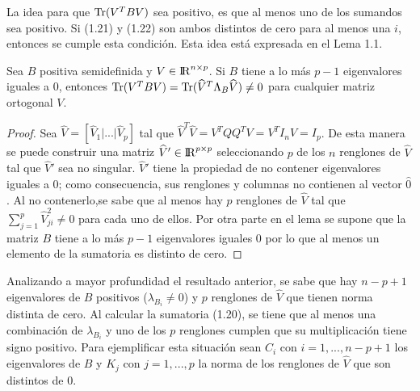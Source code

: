  La idea para que $\operatorname{Tr}(V^T B V)$ sea positivo, es que al menos uno de los sumandos sea positivo. Si (1.21) y (1.22) son ambos distintos de cero para al menos una $i$, entonces se cumple esta condición. Esta idea está expresada en el Lema 1.1.

\begin{lemma}\label{lemma2.4}
Sea $B$ positiva semidefinida y $V \in {\rm I\!R}^{n\times p}$. Si $B$ tiene a lo más $p-1$ eigenvalores iguales a $0$, entonces $\operatorname{Tr}(V^T B V)  = \operatorname{Tr}(\widehat{V}^T \Lambda_{B} \widehat{V}) \neq 0$  para cualquier matriz ortogonal $V$.
\end{lemma}

\begin{proof}
Sea $\widehat{V} = [\widehat{V}_1 | ... | \widehat{V}_p]$ tal que $\widehat{V}^T \widehat{V} = V^T Q Q^T V = V^T I_n V  = I_p$. De esta manera se puede construir una matriz $\widehat{V}' \in {\rm I\!R}^{p \times p}$ seleccionando $p$ de los $n$ renglones de $\widehat{V}$ tal que $\widehat{V}'$ sea no singular. $\widehat{V}'$ tiene la propiedad de no contener eigenvalores iguales a 0; como consecuencia, sus renglones y columnas no contienen al vector $\widehat{0}$. Al no contenerlo,se sabe que al menos hay $p$ renglones de $\widehat{V}$ tal que $\sum_{j=1}^{p}\widehat{V}_{ji}^2 \neq 0$ para cada uno de ellos. Por otra parte en el lema se supone que la matriz $B$ tiene a lo más $p-1$ eigenvalores iguales $0$ por lo que al menos un elemento de la sumatoria es distinto de cero.
\end{proof}

Analizando a mayor profundidad el resultado anterior, se sabe que hay $n-p+1$ eigenvalores de $B$ positivos ($\lambda_{B_i} \neq 0$) y $p$ renglones de $\widehat{V}$ que tienen norma distinta de cero. Al calcular la sumatoria (1.20), se tiene que al menos una combinación de $\lambda_{B_i}$ y uno de los $p$ renglones cumplen que su multiplicación tiene signo positivo. Para ejemplificar esta situación sean $C_i$ con $i = 1, ... , n-p+1$ los eigenvalores de $B$ y $K_j$ con $j = 1, ... , p$ la norma de los renglones de $\widehat{V}$ que son distintos de $0$.
 

